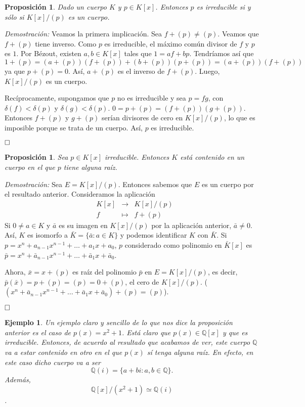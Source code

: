 \documentclass[12pt]{article}
\newtheorem{proposition}[theorem]{Proposición}
\newtheorem{example}{Ejemplo}[theorem]
\begin{document}
\begin{proposition} Dado un cuerpo $K$ y $p \in K[x]$. Entonces $p$ es irreducible si y sólo si $K[x]/(p)$ es un cuerpo.
\end{proposition}
\emph{Demostración: }Veamos la primera implicación. Sea $f + (p) \neq (p)$. Veamos que $f + (p)$ tiene inverso. Como $p$ es irreducible, el máximo común divisor de $f$ y $p$ es $1$. Por Bézout, existen $a,b \in K[x]$ tales que $1 = af + bp$. Tendríamos así que $$1 + (p) = (a+ (p))(f+(p)) + (b+(p))(p+(p)) = (a+ (p))(f+(p))$$ ya que $p+(p)=0$. Así, $a+(p)$ es el inverso de $f+(p)$. Luego, $K[x]/(p)$ es un cuerpo.

Recíprocamente, supongamos que $p$ no es irreducible y sea $p = fg$, con $\delta(f) < \delta (p)$ y $\delta(g) < \delta (p)$. $0 =p +(p) = (f+(p))(g+(p))$. Entonces $f + (p)$ y $g +(p)$ serían divisores de cero en $K[x]/(p)$, lo que es imposible porque se trata de un cuerpo. Así, $p$ es irreducible.

$\hfill \square$

\begin{proposition}\label{eq:ac1} Sea $p \in K[x]$ irreducible. Entonces $K$ está contenido en un cuerpo en el que $p$ tiene alguna raíz.
\end{proposition}
\emph{Demostración: } Sea $E = K[x]/(p)$. Entonces sabemos que $E$ es un cuerpo por el resultado anterior. Consideramos la aplicación $$\begin{array}{rccl}
&K[x]&\longrightarrow &K[x]/(p) \\
&f& \longmapsto &f+(p)
\end{array}
$$
Si $0 \neq a \in K$ y $\bar{a}$ es su imagen en $K[x]/(p)$ por la aplicación anterior, $\bar{a} \neq 0$. Así, $K$ es isomorfo a $\bar{K} = \lbrace \bar{a}: a \in K \rbrace$ y podemos identificar $K$ con $\bar{K}$. Si $p = x^{n} + a_{n-1}x^{n-1} + \ldots + a_{1}x + a_{0}$, $p$ considerado como polinomio en $\bar{K}[x]$ es $\bar{p} = x^{n}+ \bar{a}_{n-1}x^{n-1}+ \ldots + \bar{a}_{1}x + \bar{a}_{0}$.

Ahora, $\bar{x} = x +(p)$ es raíz del polinomio $\bar{p}$ en $E= K[x]/(p)$, es decir, $\bar{p}(\bar{x}) = p+(p) = (p) = 0 +(p)$, el cero de $K[x]/(p)$. ($(x^{n}+ \bar{a}_{n-1}x^{n-1}+ \ldots + \bar{a}_{1}x + \bar{a}_{0}) + (p) = (p)$).

$\hfill \square$

\begin{example} Un ejemplo claro y sencillo de lo que nos dice la proposición anterior es el caso de $p(x) = x^{2}+1$. Está claro que $p(x) \in \mathbb{Q}[x]$ y que es irreducible. Entonces, de acuerdo al resultado que acabamos de ver, este cuerpo $\mathbb{Q}$ va a estar contenido en otro en el que $p(x)$ sí tenga alguna raíz. En efecto, en este caso dicho cuerpo va a ser $$\mathbb{Q}(i) = \lbrace a + bi :a,b \in \mathbb{Q} \rbrace.$$ Además, $$\mathbb{Q}[x]/(x^{2}+1) \simeq \mathbb{Q}(i)$$.
\end{example}
\end{document}

